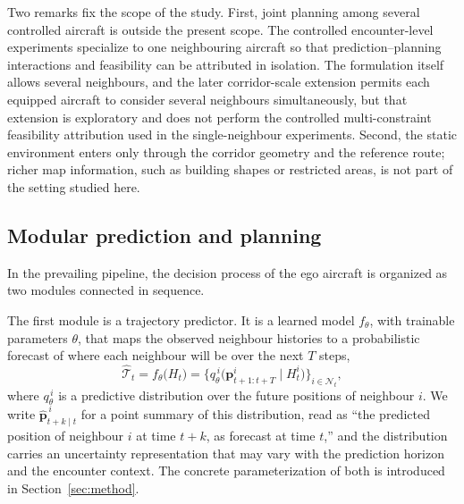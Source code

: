 \documentclass[11pt]{article}
\theoremstyle{plain}
\theoremstyle{definition}
\begin{document}
Two remarks fix the scope of the study. First, joint planning among
several controlled aircraft is outside the present scope. The
controlled encounter-level experiments specialize to one neighbouring
aircraft so that prediction--planning interactions and feasibility can
be attributed in isolation. The formulation itself allows several
neighbours, and the later corridor-scale extension permits each
equipped aircraft to consider several neighbours simultaneously, but
that extension is exploratory and does not perform the controlled
multi-constraint feasibility attribution used in the single-neighbour
experiments. Second, the static environment enters only through the
corridor geometry and the reference route; richer map information,
such as building shapes or restricted areas, is not part of the
setting studied here.
 
\subsection{Modular prediction and planning}
\label{sec:problem-pipeline}
 
In the prevailing pipeline, the decision process of the ego aircraft is
organized as two modules connected in sequence.
 
The first module is a trajectory predictor. It is a learned model
$f_{\theta}$, with trainable parameters $\theta$, that maps the observed
neighbour histories to a probabilistic forecast of where each neighbour
will be over the next $T$ steps,
\begin{equation}
	\label{eq:predictor}
	\widehat{\mathcal{T}}_t
	= f_{\theta}\big( H_t \big)
	= \big\{ q^{\,i}_{\theta}\big( \bm{p}^{i}_{t+1:t+T} \mid H^i_t \big)
	\big\}_{i \in \mathcal{N}_t},
\end{equation}
where $q^{\,i}_{\theta}$ is a predictive distribution over the future
positions of neighbour $i$. We write $\hat{\bm{p}}^{\,i}_{t+k \mid t}$
for a point summary of this distribution, read as ``the predicted
position of neighbour $i$ at time $t+k$, as forecast at time $t$,'' and
the distribution carries an uncertainty representation that may vary
with the prediction horizon and the encounter context. The concrete
parameterization of both is introduced in Section~\ref{sec:method}.
 
\end{document}
